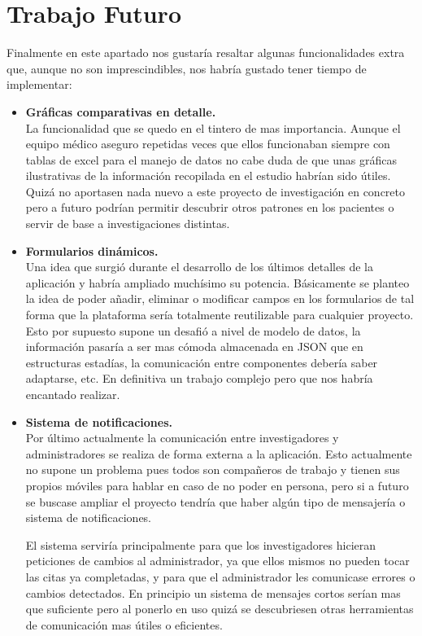 \chapter{Trabajo Futuro}
 Finalmente en este apartado nos gustaría resaltar algunas funcionalidades extra que, aunque no son imprescindibles, nos habría gustado tener tiempo de implementar:
 \newline
 
 \begin{itemize}
  \item\textbf{Gráficas comparativas en detalle.} \\
  La funcionalidad que se quedo en el tintero de mas importancia. Aunque el equipo médico aseguro repetidas veces que ellos funcionaban siempre con tablas de excel para el manejo de datos no cabe duda de que unas gráficas ilustrativas de la información recopilada en el estudio habrían sido útiles. Quizá no aportasen nada nuevo a este proyecto de investigación en concreto pero a futuro podrían permitir descubrir otros patrones en los pacientes o servir de base a investigaciones distintas. \\
  
  \item\textbf{Formularios dinámicos.} \\
  Una idea que surgió durante el desarrollo de los últimos detalles de la aplicación y habría ampliado muchísimo su potencia. Básicamente se planteo la idea de poder añadir, eliminar o modificar campos en los formularios de tal forma que la plataforma sería totalmente reutilizable para cualquier proyecto. Esto por supuesto supone un desafió a nivel de modelo de datos, la información pasaría a ser mas cómoda almacenada en JSON que en estructuras estadías, la comunicación entre componentes debería saber adaptarse, etc. En definitiva un trabajo complejo pero que nos habría encantado realizar. \\
  
  \item\textbf{Sistema de notificaciones.} \\
  Por último actualmente la comunicación entre investigadores y administradores se realiza de forma externa a la aplicación. Esto actualmente no supone un problema pues todos son compañeros de trabajo y tienen sus propios móviles para hablar en caso de no poder en persona, pero si a futuro se buscase ampliar el proyecto tendría que haber algún tipo de mensajería o sistema de notificaciones. 
  \newline
  
  El sistema serviría principalmente para que los investigadores hicieran peticiones de cambios al administrador, ya que ellos mismos no pueden tocar las citas ya completadas, y para que el administrador les comunicase errores o cambios detectados. En principio un sistema de mensajes cortos serían mas que suficiente pero al ponerlo en uso quizá se descubriesen otras herramientas de comunicación mas útiles o eficientes. \\

\end{itemize}